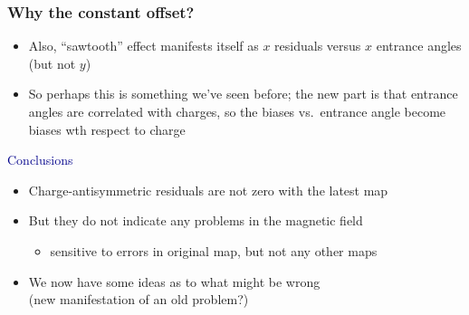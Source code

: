 \documentclass[compress]{beamer}
\begin{document}
\begin{frame}
\frametitle{Why the constant offset?}

\begin{itemize}
\item Also, ``sawtooth'' effect manifests itself as $x$ residuals versus $x$ entrance angles (but not $y$)
\item So perhaps this is something we've seen before; the new part is that entrance angles are correlated with charges, so the biases vs.~entrance angle become biases wth respect to charge

\end{itemize}

\vfill
\hspace{-0.83 cm} \textcolor{darkblue}{\Large Conclusions}

\vspace{0.25 cm}
\begin{itemize}
\item Charge-antisymmetric residuals are not zero with the latest map
\item But they do not indicate any problems in the magnetic field
\begin{itemize}
\item sensitive to errors in original map, but not any other maps
\end{itemize}
\item We now have some ideas as to what might be wrong \\ (new manifestation of an old problem?)
\end{itemize}
\label{numpages}
\end{frame}




\end{document}
